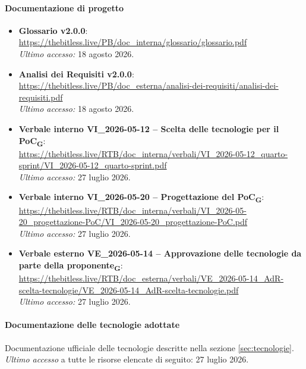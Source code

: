 \documentclass[a4paper, 10pt]{article}
\begin{document}
\paragraph{Documentazione di progetto}
\begin{itemize}
    \item \textbf{Glossario v2.0.0}: \\
    \url{https://thebitless.live/PB/doc_interna/glossario/glossario.pdf} \\
    \textit{Ultimo accesso:} 18 agosto 2026.

    \item \textbf{Analisi dei Requisiti v2.0.0}: \\
    \url{https://thebitless.live/PB/doc_esterna/analisi-dei-requisiti/analisi-dei-requisiti.pdf} \\
    \textit{Ultimo accesso:} 18 agosto 2026.

    \item \textbf{Verbale interno VI\_2026-05-12 -- Scelta delle tecnologie per il PoC\textsubscript{G}}: \\
    \url{https://thebitless.live/RTB/doc_interna/verbali/VI_2026-05-12_quarto-sprint/VI_2026-05-12_quarto-sprint.pdf} \\
    \textit{Ultimo accesso:} 27 luglio 2026.

    \item \textbf{Verbale interno VI\_2026-05-20 -- Progettazione del PoC\textsubscript{G}}: \\
    \url{https://thebitless.live/RTB/doc_interna/verbali/VI_2026-05-20_progettazione-PoC/VI_2026-05-20_progettazione-PoC.pdf} \\
    \textit{Ultimo accesso:} 27 luglio 2026.

    \item \textbf{Verbale esterno VE\_2026-05-14 -- Approvazione delle tecnologie da parte della proponente\textsubscript{G}}: \\
    \url{https://thebitless.live/RTB/doc_esterna/verbali/VE_2026-05-14_AdR-scelta-tecnologie/VE_2026-05-14_AdR-scelta-tecnologie.pdf} \\
    \textit{Ultimo accesso:} 27 luglio 2026.
\end{itemize}

\paragraph{Documentazione delle tecnologie adottate}
Documentazione ufficiale delle tecnologie descritte nella sezione \ref{sec:tecnologie}. \textit{Ultimo accesso} a tutte le risorse elencate di seguito: 27 luglio 2026.
\end{document}
